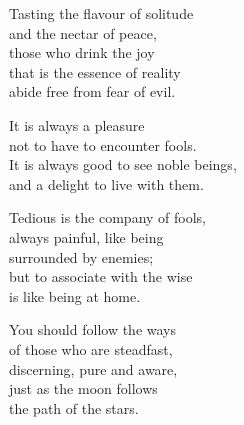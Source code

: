 Tasting the flavour of solitude\\
and the nectar of peace,\\
those who drink the joy\\
that is the essence of reality\\
abide free from fear of evil.


It is always a pleasure\\
not to have to encounter fools.\\
It is always good to see noble beings,\\
and a delight to live with them.


Tedious is the company of fools,\\
always painful, like being\\
surrounded by enemies;\\
but to associate with the wise\\
is like being at home.


You should follow the ways\\
of those who are steadfast,\\
discerning, pure and aware,\\
just as the moon follows\\
the path of the stars.

